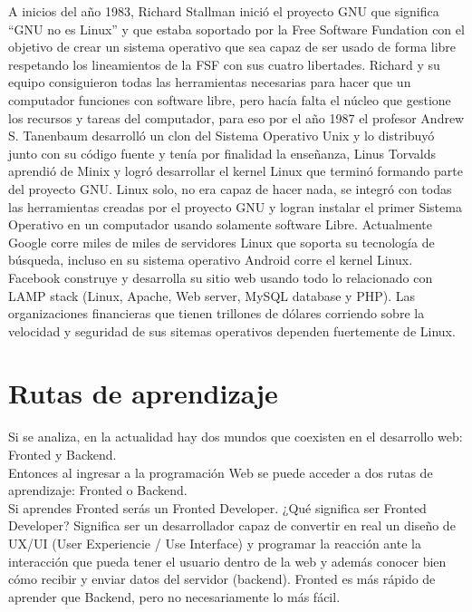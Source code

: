 \documentclass[twocolumns,a4paper]{IEEEtran}
\begin{document}
A inicios del año 1983, Richard Stallman inició el proyecto GNU que significa
``GNU no es Linux'' y que estaba soportado por la Free Software Fundation con
el objetivo de crear un sistema operativo que sea capaz de ser usado de forma
libre respetando los lineamientos de la FSF con sus cuatro libertades. Richard
y su equipo consiguieron todas las herramientas necesarias para hacer que un
computador funciones con software libre, pero hacía falta el núcleo que
gestione los recursos y tareas del computador, para eso por el año 1987 el
profesor Andrew S. Tanenbaum desarrolló un clon del Sistema Operativo Unix y lo
distribuyó junto con su código fuente y tenía por finalidad la enseñanza, Linus
Torvalds aprendió de Minix y logró desarrollar el kernel Linux que terminó
formando parte del proyecto GNU. Linux solo, no era capaz de hacer nada, se
integró con todas las herramientas creadas por el proyecto GNU y logran
instalar el primer Sistema Operativo en un computador usando solamente software
Libre.  Actualmente Google corre miles de miles de servidores Linux que soporta
su tecnología de búsqueda, incluso en su sistema operativo Android corre el
kernel Linux. Facebook construye y desarrolla su sitio web usando todo lo
relacionado con LAMP stack (Linux, Apache, Web server, MySQL database y PHP).
Las organizaciones financieras que tienen trillones de dólares corriendo sobre
la velocidad y seguridad de sus sitemas operativos dependen fuertemente de
Linux\cite{ChrisNegusLinux2005}.
\newline

\section{Rutas de aprendizaje}
Si se analiza, en la actualidad hay dos mundos que coexisten en el desarrollo
web: Fronted y Backend.\\
Entonces al ingresar a la programación Web se puede acceder a dos rutas de
aprendizaje: Fronted o Backend.\\

Si aprendes Fronted serás un Fronted Developer. 
¿Qué significa ser Fronted Developer? Significa ser un desarrollador capaz de
convertir en real un diseño de UX/UI (User Experiencie / Use Interface) y
programar la reacción ante la interacción que pueda tener el usuario dentro de
la web y además conocer bien cómo recibir y enviar datos del servidor
(backend). Fronted es más rápido de aprender que Backend, pero no
necesariamente lo más fácil.\\
\end{document}
